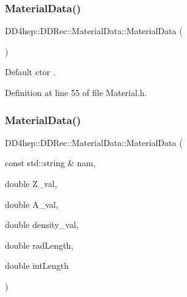 \hypertarget{class_d_d4hep_1_1_d_d_rec_1_1_material_data_ae227988b42f40660dd9d59e0caecb1ef}{}\label{class_d_d4hep_1_1_d_d_rec_1_1_material_data_ae227988b42f40660dd9d59e0caecb1ef} 
\subsubsection{\texorpdfstring{Material\+Data()}{MaterialData()}\hspace{0.1cm}{\footnotesize\ttfamily [2/5]}}
{\footnotesize\ttfamily D\+D4hep\+::\+D\+D\+Rec\+::\+Material\+Data\+::\+Material\+Data (\begin{DoxyParamCaption}{ }\end{DoxyParamCaption})\hspace{0.3cm}{\ttfamily [inline]}}

Default c\textquotesingle{}tor . 

Definition at line 55 of file Material.\+h.

\hypertarget{class_d_d4hep_1_1_d_d_rec_1_1_material_data_adff4c3a5132ae55171ed9801b107d5fe}{}\label{class_d_d4hep_1_1_d_d_rec_1_1_material_data_adff4c3a5132ae55171ed9801b107d5fe} 
\subsubsection{\texorpdfstring{Material\+Data()}{MaterialData()}\hspace{0.1cm}{\footnotesize\ttfamily [3/5]}}
{\footnotesize\ttfamily D\+D4hep\+::\+D\+D\+Rec\+::\+Material\+Data\+::\+Material\+Data (\begin{DoxyParamCaption}\item[{const std\+::string \&}]{nam,  }\item[{double}]{Z\+\_\+val,  }\item[{double}]{A\+\_\+val,  }\item[{double}]{density\+\_\+val,  }\item[{double}]{rad\+Length,  }\item[{double}]{int\+Length }\end{DoxyParamCaption})\hspace{0.3cm}{\ttfamily [inline]}}


